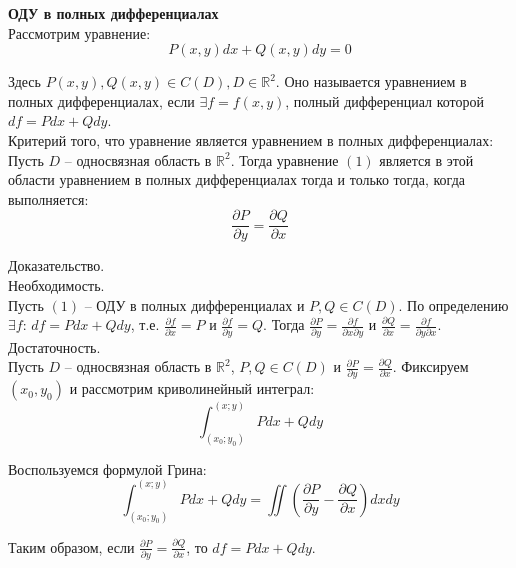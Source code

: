 \documentclass{article}
\begin{document}
	
	\textbf{ОДУ в полных дифференциалах}\\

	Рассмотрим уравнение:
	\begin{equation}
		P(x,y)dx + Q(x,y)dy = 0
	\end{equation}

	Здесь $P(x,y), Q(x,y) \in C(D), D\in \mathbb{R}^2$. Оно называется уравнением в полных дифференциалах, если $\exists f=f(x,y)$, полный дифференциал которой $df = Pdx + Qdy$.\\

	Критерий того, что уравнение является уравнением в полных дифференциалах:\\

	Пусть $D$ -- односвязная область в $\mathbb{R}^2$. Тогда уравнение $(1)$ является в этой области уравнением в полных дифференциалах тогда и только тогда, когда выполняется:
	\begin{equation}
		\frac{\partial P}{\partial y} = \frac{\partial Q}{\partial x}
	\end{equation}

	Доказательство.\\

	Необходимость.\\

	Пусть $(1)$ -- ОДУ в полных дифференциалах и $P, Q \in C(D)$. По определению $\exists f$: $df = Pdx + Qdy$, т.е. $\frac{\partial f}{\partial x} = P$ и $\frac{\partial f}{\partial y} = Q$. Тогда $\frac{\partial P}{\partial y} = \frac{\partial f}{\partial x\partial y}$ и $\frac{\partial Q}{\partial x} = \frac{\partial f}{\partial y\partial x}$.\\

	Достаточность.\\

	Пусть $D$ -- односвязная область в $\mathbb{R}^2$, $P, Q \in C(D)$ и $\frac{\partial P}{\partial y} = \frac{\partial Q}{\partial x}$. Фиксируем $(x_0,y_0)$ и рассмотрим криволинейный интеграл:
	\begin{equation}
		\int_{(x_0;y_0)}^{(x;y)} Pdx + Qdy
	\end{equation}

	Воспользуемся формулой Грина:
	\begin{equation}
		\int_{(x_0;y_0)}^{(x;y)} Pdx + Qdy = \iint (\frac{\partial P}{\partial y} - \frac{\partial Q}{\partial x})dxdy
	\end{equation}

	Таким образом, если $\frac{\partial P}{\partial y} = \frac{\partial Q}{\partial x}$, то $df=Pdx+Qdy$.\\
\end{document}

